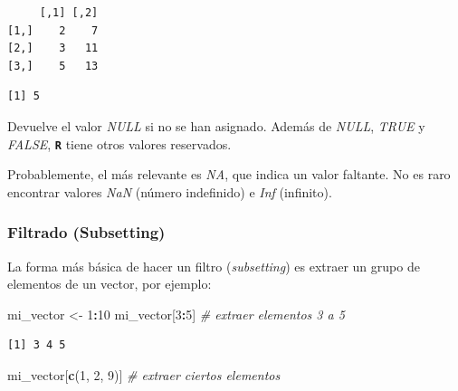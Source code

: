 \documentclass[
]{article}
\newenvironment{Shaded}{\begin{snugshade}}{\end{snugshade}}
\newcommand{\CommentTok}[1]{\textcolor[rgb]{0.56,0.35,0.01}{\textit{#1}}}
\newcommand{\DecValTok}[1]{\textcolor[rgb]{0.00,0.00,0.81}{#1}}
\newcommand{\FunctionTok}[1]{\textcolor[rgb]{0.13,0.29,0.53}{\textbf{#1}}}
\newcommand{\NormalTok}[1]{#1}
\newcommand{\OtherTok}[1]{\textcolor[rgb]{0.56,0.35,0.01}{#1}}
\newcommand{\SpecialCharTok}[1]{\textcolor[rgb]{0.81,0.36,0.00}{\textbf{#1}}}
\begin{document}
\begin{Shaded}
\end{Shaded}

\begin{verbatim}
     [,1] [,2]
[1,]    2    7
[2,]    3   11
[3,]    5   13
\end{verbatim}

\begin{Shaded}
\end{Shaded}

\begin{verbatim}
[1] 5
\end{verbatim}

Devuelve el valor \emph{NULL} si no se han asignado. Además de \emph{NULL}, \emph{TRUE} y \emph{FALSE}, \textbf{\texttt{R}} tiene otros valores reservados.

Probablemente, el más relevante es \emph{NA}, que indica un valor faltante. No es raro encontrar valores \emph{NaN} (número indefinido) e \emph{Inf} (infinito).

\hypertarget{filtrado-subsetting}{%
\subsubsection{Filtrado (Subsetting)}\label{filtrado-subsetting}}

La forma más básica de hacer un filtro (\emph{subsetting}) es extraer un grupo de elementos de un vector, por ejemplo:

\begin{Shaded}
\begin{Highlighting}[]
\NormalTok{mi\_vector }\OtherTok{\textless{}{-}} \DecValTok{1}\SpecialCharTok{:}\DecValTok{10}
\NormalTok{mi\_vector[}\DecValTok{3}\SpecialCharTok{:}\DecValTok{5}\NormalTok{]  }\CommentTok{\# extraer elementos 3 a 5}
\end{Highlighting}
\end{Shaded}

\begin{verbatim}
[1] 3 4 5
\end{verbatim}

\begin{Shaded}
\begin{Highlighting}[]
\NormalTok{mi\_vector[}\FunctionTok{c}\NormalTok{(}\DecValTok{1}\NormalTok{, }\DecValTok{2}\NormalTok{, }\DecValTok{9}\NormalTok{)]  }\CommentTok{\# extraer ciertos elementos}
\end{Highlighting}
\end{Shaded}
\end{document}
